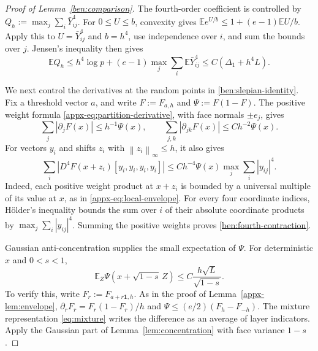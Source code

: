 \documentclass[11pt,letterpaper]{article}
\newenvironment{recovered}{}{}
\theoremstyle{remark}
\newcommand{\E}{\mathbb E}
\newcommand{\norm}[1]{\left\lVert#1\right\rVert}
\begin{document}
\begin{recovered}
\begin{proof}[Proof of Lemma~\ref{ben:comparison}]
The fourth-order coefficient is controlled by
\(Q_h:=\max_j\sum_i\bar Y_{ij}^4\). For \(0\le U\le b\),
convexity gives \(\E e^{U/b}\le1+(e-1)\E U/b\).
Apply this to \(U=\bar Y_{ij}^4\) and \(b=h^4\), use
independence over \(i\), and sum the bounds over \(j\).
Jensen's inequality then gives
\begin{equation}\label{ben:fourth-maximum}
 \E Q_h\le h^4\log p+(e-1)\max_j\sum_i\E\bar Y_{ij}^4
       \le C(\Delta_1+h^4L).
\end{equation}

We next control the derivatives at the random points in
\eqref{ben:slepian-identity}. Fix a threshold vector \(a\), and
write \(F:=F_{a,h}\) and \(\Psi:=F(1-F)\).
The positive weight formula \eqref{appx-eq:partition-derivative},
with face normals \(\pm e_j\), gives
\[
 \sum_j|\partial_jF(x)|\le h^{-1}\Psi(x),\qquad
 \sum_{j,k}|\partial_{jk}F(x)|\le Ch^{-2}\Psi(x).
\]
For vectors \(y_i\) and shifts \(z_i\) with
\(\norm{z_i}_\infty\le h\), it also gives
\begin{equation}\label{ben:fourth-contraction}
 \sum_i|D^4F(x+z_i)[y_i,y_i,y_i,y_i]|
 \le Ch^{-4}\Psi(x)\max_j\sum_i|y_{ij}|^4.
\end{equation}
Indeed, each positive weight product at \(x+z_i\) is bounded by
a universal multiple of its value at \(x\), as in
\eqref{appx-eq:local-envelope}. For every four coordinate indices,
H\"older's inequality bounds the sum over \(i\) of their absolute
coordinate products by \(\max_j\sum_i|y_{ij}|^4\). Summing the
positive weights proves \eqref{ben:fourth-contraction}.

Gaussian anti-concentration supplies the small expectation of
\(\Psi\). For deterministic \(x\) and \(0<s<1\),
\begin{equation}\label{ben:gaussian-envelope}
 \E_Z\Psi(x+\sqrt{1-s}\,Z)
 \le C\frac{h\sqrt L}{\sqrt{1-s}}.
\end{equation}
To verify this, write \(F_r:=F_{a+r\mathbf1,h}\).
As in the proof of Lemma~\ref{appx-lem:envelope},
\(\partial_rF_r=F_r(1-F_r)/h\) and
\(\Psi\le(e/2)(F_h-F_{-h})\).
The mixture representation \eqref{eq:mixture} writes the difference
as an average of layer indicators. Apply the Gaussian part of
Lemma~\ref{lem:concentration} with face variance \(1-s\).


\end{proof}
\end{recovered}
\end{document}
